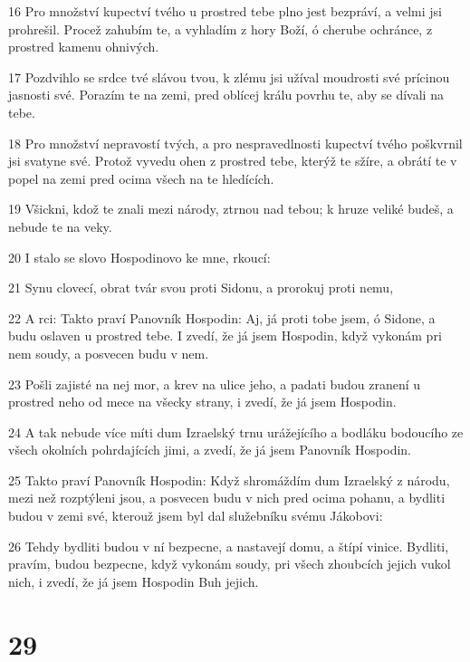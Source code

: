 \par 16 Pro množství kupectví tvého u prostred tebe plno jest bezpráví, a velmi jsi prohrešil. Procež zahubím te, a vyhladím z hory Boží, ó cherube ochránce, z prostred kamenu ohnivých.
\par 17 Pozdvihlo se srdce tvé slávou tvou, k zlému jsi užíval moudrosti své prícinou jasnosti své. Porazím te na zemi, pred oblícej králu povrhu te, aby se dívali na tebe.
\par 18 Pro množství nepravostí tvých, a pro nespravedlnosti kupectví tvého poškvrnil jsi svatyne své. Protož vyvedu ohen z prostred tebe, kterýž te sžíre, a obrátí te v popel na zemi pred ocima všech na te hledících.
\par 19 Všickni, kdož te znali mezi národy, ztrnou nad tebou; k hruze veliké budeš, a nebude te na veky.
\par 20 I stalo se slovo Hospodinovo ke mne, rkoucí:
\par 21 Synu clovecí, obrat tvár svou proti Sidonu, a prorokuj proti nemu,
\par 22 A rci: Takto praví Panovník Hospodin: Aj, já proti tobe jsem, ó Sidone, a budu oslaven u prostred tebe. I zvedí, že já jsem Hospodin, když vykonám pri nem soudy, a posvecen budu v nem.
\par 23 Pošli zajisté na nej mor, a krev na ulice jeho, a padati budou zranení u prostred neho od mece na všecky strany, i zvedí, že já jsem Hospodin.
\par 24 A tak nebude více míti dum Izraelský trnu urážejícího a bodláku bodoucího ze všech okolních pohrdajících jimi, a zvedí, že já jsem Panovník Hospodin.
\par 25 Takto praví Panovník Hospodin: Když shromáždím dum Izraelský z národu, mezi než rozptýleni jsou, a posvecen budu v nich pred ocima pohanu, a bydliti budou v zemi své, kterouž jsem byl dal služebníku svému Jákobovi:
\par 26 Tehdy bydliti budou v ní bezpecne, a nastavejí domu, a štípí vinice. Bydliti, pravím, budou bezpecne, když vykonám soudy, pri všech zhoubcích jejich vukol nich, i zvedí, že já jsem Hospodin Buh jejich.

\chapter{29}

